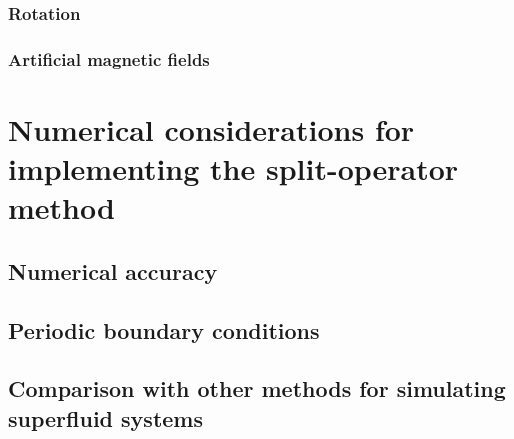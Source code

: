 \subsubsection{Rotation}

\subsubsection{Artificial magnetic fields}

\section{Numerical considerations for implementing the split-operator method}

\subsection{Numerical accuracy}

\subsection{Periodic boundary conditions}

\subsection{Comparison with other methods for simulating superfluid systems}
